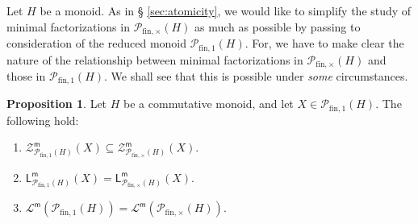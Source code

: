 \documentclass{report}
\renewcommand{\P}{\mathcal{P}}
\newcommand{\Z}{\mathcal{Z}}
\newcommand{\fin}{\textrm{fin}}
\newcommand{\funt}{{\textrm{fin}, \times}}
\newcommand{\fun}{{\textrm{fin}, 1}}
\newcommand{\m}{{\mathsf{m}}}
\renewcommand{\:}{\text{:}}
\theoremstyle{definition}
\newtheorem{prop}[defn]{Proposition}
\begin{document}
%
Let $H$ be a monoid. As in \S{ }\ref{sec:atomicity}, we would like to simplify the study of minimal factorizations in $\P_\funt(H)$ as much as possible by passing to consideration of the reduced monoid $\P_\fun(H)$. For, we have to make clear the nature of the relationship between minimal factorizations in $\P_\funt(H)$ and those in $\P_\fun(H)$.
We shall see that this is possible under \textit{some} circumstances. 
%
\begin{prop}\label{prop:comm-pm}
	Let $H$ be a commutative monoid, and let $X\in \P_{\fin,1}(H)$. The following hold:
	\begin{enumerate}[label = {\rm (\roman{*})}]
		\item\label{it:prop:comm-pm(i)} $\Z_{\P_{\fin,1}(H)}^\m(X) \subseteq \Z_{\P_{\funt}(H)}^\m(X)$.
		\item\label{it:prop:comm-pm(ii)} $\mathsf{L}_{\P_{\fin,1}(H)}^\m(X) = \mathsf{L}_{\P_\funt(H)}^\m(X)$.
		\item\label{it:prop:comm-pm(iii)} $\mathcal{L}^\m(\P_{\fin,1}(H)) = \mathcal{L}^\m(\P_\funt(H))$.
	\end{enumerate}
\end{prop}
%
\end{document}
